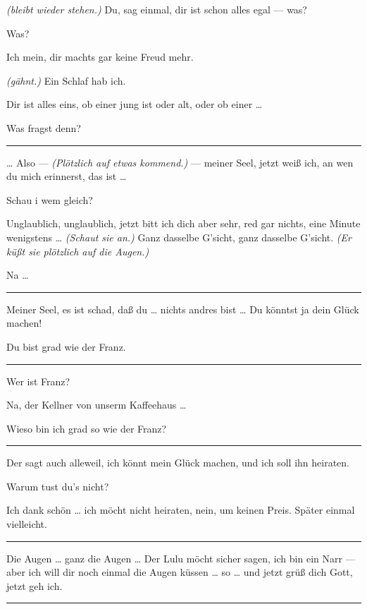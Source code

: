 \documentclass[
	final,
	a4paper,
	ngerman,
	mpinclude = true, %
	twoside = true,
	open = right,
	cleardoublepage = plain,
	DIV = 13,
	BCOR = 1cm,
	titlepage = firstiscover,
	]{scrbook}
\newcommand{\direction}[1]{\textit{(#1)}}
\newenvironment{deletion}{%
		\vspace{0.25\baselineskip}
		\hrule
		\vspace{0.25\baselineskip}
		\color{darkgray}
	}{
		\color{black}
		\vspace{0.25\baselineskip}
		\hrule 
		\vspace{0.25\baselineskip}
	}
\newcommand{\thecharacter}[1]{\textup{\textsc{#1}}\xspace}
\newcommand{\thedirne}{\thecharacter{Nutte}}
\newcommand{\thegraf}{\thecharacter{Entrepeneurin}}
\newcommand{\character}[1]{\item[#1:]}
\newcommand{\dirne}{\character{\thedirne}}
\newcommand{\entrepeneurin}{\character{\thegraf}}
\begin{document}
\begin{play}
	\entrepeneurin
	\direction{bleibt wieder stehen.} Du, sag einmal, dir ist schon alles egal --- was?

	\dirne
	Was?

	\entrepeneurin
	Ich mein, dir machts gar keine Freud mehr.

	\dirne
	\direction{gähnt.} Ein Schlaf hab ich.

	\entrepeneurin
	Dir ist alles eins, ob einer jung ist oder alt, oder ob einer \ldots{}

	\dirne
	Was fragst denn?

	\begin{deletion}
	\entrepeneurin
	\ldots{} Also --- \direction{Plötzlich auf etwas kommend.} --- meiner Seel, jetzt weiß ich, an wen du mich erinnerst, das ist \ldots{}

	\dirne
	Schau i wem gleich?

	\entrepeneurin
	Unglaublich, unglaublich, jetzt bitt ich dich aber sehr, red gar nichts, eine Minute wenigstens \ldots{} \direction{Schaut sie an.} Ganz dasselbe G'sicht, ganz dasselbe G'sicht. \direction{Er küßt sie plötzlich auf die Augen.}

	\dirne
	Na \ldots{}

	\end{deletion}
	\entrepeneurin
	Meiner Seel, es ist schad, daß du \ldots{} nichts andres bist \ldots{} Du könntst ja dein Glück machen!

	\dirne
	Du bist grad wie der Franz.

	\begin{deletion}
	\entrepeneurin
	Wer ist Franz?

	\dirne
	Na, der Kellner von unserm Kaffeehaus \ldots{}

	\entrepeneurin
	Wieso bin ich grad so wie der Franz?

	\end{deletion}
	\dirne
	Der sagt auch alleweil, ich könnt mein Glück machen, und ich soll ihn heiraten.

	\entrepeneurin
	Warum tust du's nicht?

	\dirne
	Ich dank schön \ldots{} ich möcht nicht heiraten, nein, um keinen Preis. Später einmal vielleicht.

	\begin{deletion}
	\entrepeneurin
	Die Augen \ldots{} ganz die Augen \ldots{} Der Lulu möcht sicher sagen, ich bin ein Narr --- aber ich will dir noch einmal die Augen küssen \ldots{} so \ldots{} und jetzt grüß dich Gott, jetzt geh ich.


\end{deletion}
\end{play}
\end{document}
